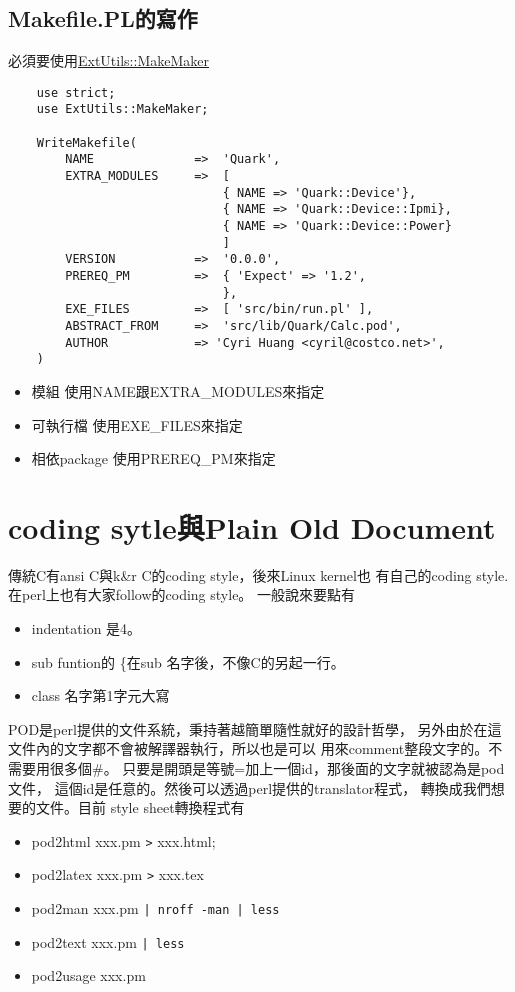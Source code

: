     \subsection{Makefile.PL的寫作}
    必須要使用\href{http://search.cpan.org/~mschwern/ExtUtils-MakeMaker-6.64/lib/ExtUtils/MakeMaker.pm}{ExtUtils::MakeMaker}
    \begin{verbatim}
    use strict;
    use ExtUtils::MakeMaker;

    WriteMakefile(
        NAME              =>  'Quark',
        EXTRA_MODULES     =>  [
                              { NAME => 'Quark::Device'},
                              { NAME => 'Quark::Device::Ipmi},
                              { NAME => 'Quark::Device::Power}
                              ]
        VERSION           =>  '0.0.0',
        PREREQ_PM         =>  { 'Expect' => '1.2',
                              },
        EXE_FILES         =>  [ 'src/bin/run.pl' ],
        ABSTRACT_FROM     =>  'src/lib/Quark/Calc.pod',
        AUTHOR            => 'Cyri Huang <cyril@costco.net>',
    )
    \end{verbatim}

    \begin{itemize}
    \item 模組 使用NAME跟EXTRA\_MODULES來指定
    \item 可執行檔 使用EXE\_FILES來指定
    \item 相依package 使用PREREQ\_PM來指定
    \end{itemize}
    \section{coding sytle與Plain Old Document}
    傳統C有ansi C與k\&r C的coding style，後來Linux kernel也
    有自己的coding style.在perl上也有大家follow的coding style。
    一般說來要點有
    \begin{itemize}
      \item indentation 是4。
      \item sub funtion的 \{在sub 名字後，不像C的另起一行。
      \item class 名字第1字元大寫
    \end{itemize}
    POD是perl提供的文件系統，秉持著越簡單隨性就好的設計哲學，
    另外由於在這文件內的文字都不會被解譯器執行，所以也是可以
    用來comment整段文字的。不需要用很多個\#。
    只要是開頭是等號=加上一個id，那後面的文字就被認為是pod文件，
    這個id是任意的。然後可以透過perl提供的translator程式，
    轉換成我們想要的文件。目前 style sheet轉換程式有
    \begin{itemize}
    \item pod2html xxx.pm \verb=>= xxx.html;
    \item pod2latex xxx.pm \verb=>= xxx.tex
    \item pod2man xxx.pm \verb=| nroff -man | less=
    \item pod2text xxx.pm \verb=| less=
    \item pod2usage xxx.pm
    \end{itemize}


